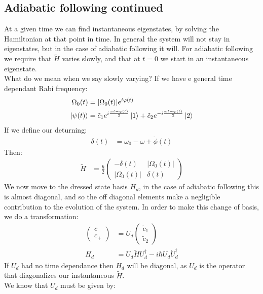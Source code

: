 \subsection{Adiabatic following continued}
At a given time we can find instantaneous eigenstates, by solving the Hamiltonian at that point in time. In general the system will not stay in eigenstates, but in the case of adiabatic following it will. For adiabatic following we require that $\tilde{H}$ varies slowly, and that at $t=0$ we start in an instantaneous eigenstate. \\
What do we mean when we say slowly varying? If we have e general time dependant Rabi frequency:
\begin{align*}
	\Omega_0(t) &= |\Omega_0(t)| e^{i\varphi(t)} \\
	\ket{\psi(t)} &= \tilde{c}_1 e^{i\frac{\omega t - \varphi(t)}{2}} \ket{1} + \tilde{c}_2 e^{-i \frac{\omega t - \varphi(t)}{2}} \ket{2}
\end{align*}
If we define our deturning:
\begin{align*}
	\delta(t) &= \omega_0 - \omega + \dot{\phi}(t)
\end{align*}
Then:
\begin{align*}
	\tilde{H} &= \frac{\hbar}{2} \begin{pmatrix}
		-\delta(t) & |\Omega_0(t)| \\
		|\Omega_0(t)| & \delta(t)
			      \end{pmatrix}
\end{align*}
We now move to the dressed state basis $H_d$, in the case of adiabatic following this is almost diagonal, and so the off diagonal elements make a negligible contribution to the evolution of the system. In order to make this change of basis, we do a transformation:
\begin{align*}
	\begin{pmatrix}
		c_- \\
		c_+
	\end{pmatrix} &= U_d \begin{pmatrix}
		\tilde{c}_1 \\
		\tilde{c}_2
		    \end{pmatrix} \\
	H_d &= U_d\tilde{H}U_d^\dagger - i\hbar U_d\dot{U}_d^\dagger
\end{align*}
If $U_d$ had no time dependance then $H_d$ will be diagonal, as $U_d$ is the operator that diagonalizes our instantaneous $\tilde{H}$. \\
We know that $U_d$ must be given by:
